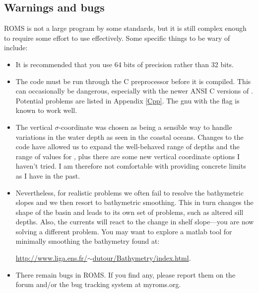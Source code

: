 \subsection{Warnings and bugs}
ROMS is not a large program by some standards, but it is still complex
enough to require some effort to use effectively.
Some specific things to be wary of include:
\begin{itemize}
  \item It is recommended that you use 64 bits of precision rather
than 32 bits.
  \item The code must be run through the C preprocessor before it
is compiled.  This can occasionally be dangerous, especially with
the newer ANSI C versions of .  Potential problems are listed
in Appendix \ref{Cpp}. The gnu  with the  flag
is known to work well.
  \item The vertical $\sigma$-coordinate was chosen as being a sensible
way to handle variations in the water depth as seen in the coastal
oceans. Changes to the code have allowed us to expand the well-behaved
range of depths and the range of values for , plus
there are some new vertical coordinate options I haven't tried. I am
therefore not comfortable with providing concrete limits as I have in
the past.
  \item Nevertheless, for realistic problems we often fail to resolve the
bathymetric slopes and we then resort to bathymetric smoothing.
This in turn changes the shape of the basin and leads to its own set of
problems, such as altered sill depths. Also, the currents will react to
the change in shelf slope---you are now solving a different problem.
You may want to explore a matlab tool for minimally smoothing
the bathymetry found at:

\href{http://www.liga.ens.fr/~dutour/Bathymetry/index.html}{http://www.liga.ens.fr/$\sim$dutour/Bathymetry/index.html}.
  \item There remain bugs in ROMS. If you find any, please report
them on the forum and/or the bug tracking system at myroms.org.
\end{itemize}
